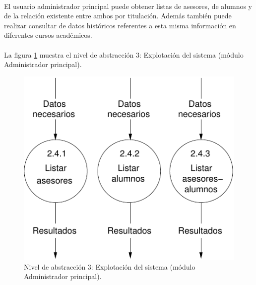 \paragraph{}El usuario administrador principal puede obtener listas de asesores,
de alumnos y de la relación existente entre ambos por titulación. Además también
puede realizar consultar de datos históricos referentes a esta misma información
en diferentes cursos académicos.

\paragraph{}La figura \ref{diagramaNivel3-ExplotacionSistema-adminPrincipal}
muestra el nivel de abstracción 3: Explotación del sistema (módulo Administrador
principal).

  \begin{figure}[!ht]
    \begin{center}
      \includegraphics[]{08.Analisis_Funcional/8.2.DFDs/Niveles/Nivel3/AdministradorPrincipal/ExplotacionSistema/Diagramas/nivel3-ExplotacionSistema.pdf}
      \caption{Nivel de abstracción 3: Explotación del sistema (módulo
      Administrador principal).}
      \label{diagramaNivel3-ExplotacionSistema-adminPrincipal}
    \end{center}
  \end{figure}
